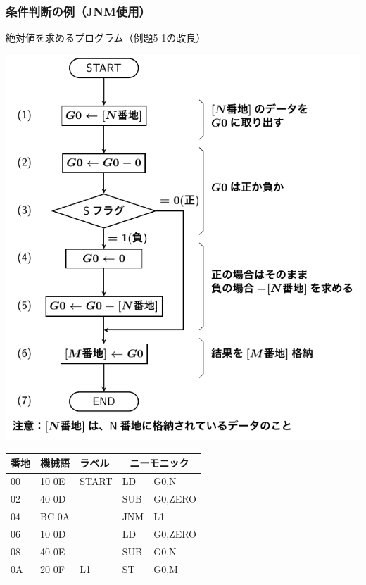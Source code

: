 \documentclass{beamer}                 %
\begin{document}
\begin{frame}
  \frametitle{条件判断の例（JNM使用）}
  絶対値を求めるプログラム（例題5-1の改良）\\
  \vfill
  \begin{minipage}{0.49\columnwidth}
    \centerline{\includegraphics[scale=0.5]{../Tikz/flow1.pdf}}
  \end{minipage}
  \begin{minipage}{0.5\columnwidth}
    {\ttfamily\scriptsize\begin{center}
      \begin{tabular}{|l|l|l|l l|}
        \hline
        番地 & 機械語 & ラベル & \multicolumn{2}{|c|}{ニーモニック} \\
        \hline
        00 & 10 0E & START& LD   & G0,N    \\
        02 & 40 0D &      & SUB  & G0,ZERO \\
        04 & BC 0A &      & JNM  & L1      \\
        06 & 10 0D &      & LD   & G0,ZERO \\
        08 & 40 0E &      & SUB  & G0,N    \\
        0A & 20 0F & L1   & ST   & G0,M    \\

\end{tabular}
\end{center}}
\end{minipage}
\end{frame}
\end{document}
